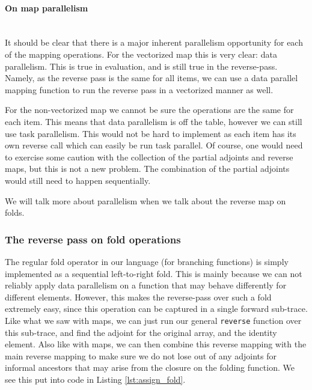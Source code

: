             \paragraph*{On map parallelism}\mbox{}\\
                It should be clear that there is a major inherent parallelism opportunity for each of the mapping operations.
                For the vectorized map this is very clear: data parallelism.
                This is true in evaluation, and is still true in the reverse-pass.
                Namely, as the reverse pass is the same for all items, we can use a data parallel mapping function to run the reverse pass in a vectorized manner as well.

                For the non-vectorized map we cannot be sure the operations are the same for each item.
                This means that data parallelism is off the table, however we can still use task parallelism.
                This would not be hard to implement as each item has its own reverse call which can easily be run task parallel.
                Of course, one would need to exercise some caution with the collection of the partial adjoints and reverse maps, but this is not a new problem.
                The combination of the partial adjoints would still need to happen sequentially.

                We will talk more about parallelism when we talk about the reverse map on folds.

        \subsubsection{The reverse pass on fold operations}
            The regular fold operator in our language (for branching functions) is simply implemented as a sequential left-to-right fold.
            This is mainly because we can not reliably apply data parallelism on a function that may behave differently for different elements.
            However, this makes the reverse-pass over such a fold extremely easy, since this operation can be captured in a single forward sub-trace.
            Like what we saw with maps, we can just run our general \texttt{reverse} function over this sub-trace, and find the adjoint for the original array, and the identity element.
            Also like with maps, we can then combine this reverse mapping with the main reverse mapping to make sure we do not lose out of any adjoints for informal ancestors that may arise from the closure on the folding function.
            We see this put into code in Listing \ref{lst:assign_fold}.

